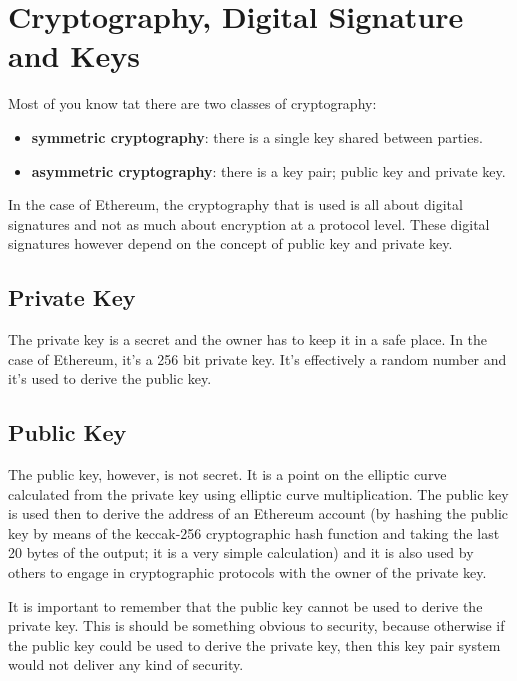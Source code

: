 \section{Cryptography, Digital Signature and
Keys}\label{cryptography-digital-signature-and-keys}

Most of you know tat there are two classes of cryptography:

\begin{itemize}
\tightlist
\item
  \textbf{symmetric cryptography}: there is a single key shared between
  parties.
\item
  \textbf{asymmetric cryptography}: there is a key pair; public key and
  private key.
\end{itemize}

In the case of Ethereum, the cryptography that is used is all about
digital signatures and not as much about encryption at a protocol level.
These digital signatures however depend on the concept of public key and
private key.

\subsection{Private Key}\label{private-key}

The private key is a secret and the owner has to keep it in a safe
place. In the case of Ethereum, it's a 256 bit private key. It's
effectively a random number and it's used to derive the public key.

\subsection{Public Key}\label{public-key}

The public key, however, is not secret. It is a point on the elliptic
curve calculated from the private key using elliptic curve
multiplication. The public key is used then to derive the address of an
Ethereum account (by hashing the public key by means of the keccak-256
cryptographic hash function and taking the last 20 bytes of the output;
it is a very simple calculation) and it is also used by others to engage
in cryptographic protocols with the owner of the private key.

It is important to remember that the public key cannot be used to derive
the private key. This is should be something obvious to security,
because otherwise if the public key could be used to derive the private
key, then this key pair system would not deliver any kind of security.

